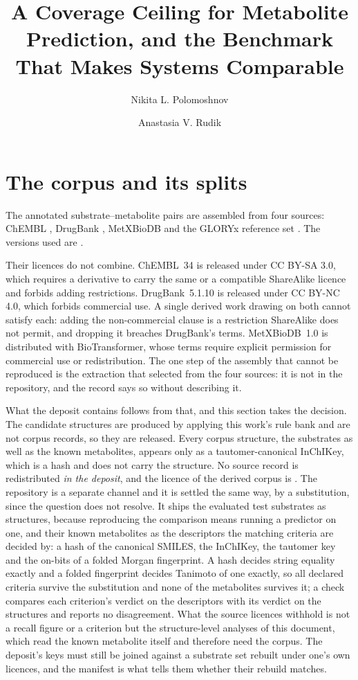\documentclass[journal=jcisd8,manuscript=suppinfo,layout=onecolumn]{achemso}
\author{Nikita L. Polomoshnov}
\affiliation{Faculty of Bioengineering and Bioinformatics, Lomonosov Moscow State University,
Leninskie Gory 1-73, Moscow 119234, Russia}
\author{Anastasia V. Rudik}
\affiliation{Department of Bioinformatics, Institute of Biomedical Chemistry,
Pogodinskaya Str. 10-8, Moscow 119121, Russia}
\title{A Coverage Ceiling for Metabolite Prediction, and the Benchmark That Makes Systems Comparable}
\begin{document}
\maketitle

\section{The corpus and its splits}
\label{sec:si-corpus}



The annotated substrate--metabolite pairs are assembled from four sources: ChEMBL
\citep{Zdrazil_2024}, DrugBank \citep{Wishart_2018}, MetXBioDB \citep{Djoumbou_Feunang_2019} and
the GLORYx reference set \citep{de_Bruyn_Kops_2020}. The versions used are \CorpusVersions{}.

Their licences do not combine. ChEMBL~34 is released under CC BY-SA 3.0, which requires a
derivative to carry the same or a compatible ShareAlike licence and forbids adding restrictions.
DrugBank~5.1.10 is released under CC BY-NC 4.0, which forbids commercial use. A single derived
work drawing on both cannot satisfy each: adding the non-commercial clause is a restriction
ShareAlike does not permit, and dropping it breaches DrugBank's terms. MetXBioDB~1.0 is
distributed with BioTransformer, whose terms require explicit permission for commercial use or
redistribution. The one step of the assembly that cannot be reproduced is the extraction
that selected from the four sources: it is not in the repository, and the record says so without
describing it.

What the deposit contains follows from that, and this section takes the decision.
The candidate structures are produced by applying this work's rule bank and are not corpus
records, so they are released. Every corpus structure, the substrates as well as the known
metabolites, appears only as a tautomer-canonical InChIKey, which is a hash and does not carry
the structure. No source record is redistributed \emph{in the deposit}, and the licence of the
derived corpus is \CorpusLicence{}. The repository is a separate channel and it is settled the same
way, by a substitution, since the question does not resolve. It ships the
evaluated test substrates as structures, because reproducing the comparison means running a
predictor on one, and their known metabolites as the descriptors the matching criteria are
decided by: a hash of the canonical SMILES, the InChIKey, the tautomer key and the on-bits of a
folded Morgan fingerprint. A hash decides string equality exactly and a folded fingerprint decides
Tanimoto of one exactly, so all \numCritCriteria{} declared criteria survive the substitution and
none of the metabolites survives it; a check compares each criterion's verdict on the descriptors
with its verdict on the structures and reports no disagreement. What the source licences withhold is
not a recall figure or a criterion but the structure-level
analyses of this document, which read the known metabolite itself and therefore need the corpus.
The deposit's keys must still be joined against a substrate set rebuilt under one's own licences,
and the manifest is what tells them whether their rebuild matches.
\end{document}
